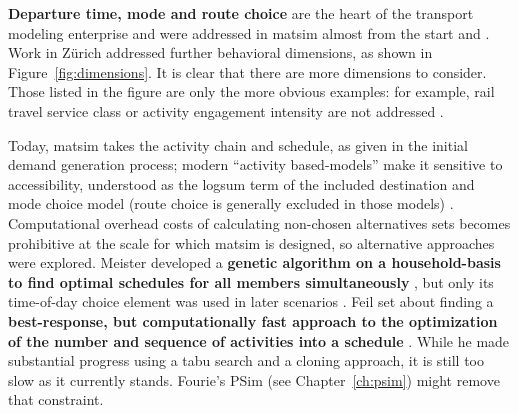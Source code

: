
\textbf{Departure time, mode and route choice} are the heart of the transport modeling enterprise and were addressed in \gls{matsim} almost from the start \citep{RaneyNagel2004agdb} and \citep{BalmerRaneyEtAl2005act-times,RieserGretherNagel2008modeChoiceCalculations}.
%
Work in Zürich addressed further behavioral dimensions, 
as shown in Figure~\ref{fig:dimensions}.
It is clear that there are more dimensions to consider. Those listed in the figure are only the more obvious examples: for example, rail travel service class or activity engagement intensity are not addressed . 

Today, \gls{matsim} takes the activity chain and schedule, as given in the initial demand generation process; modern ``activity based-models'' make it sensitive to accessibility, understood as the logsum term of the included destination and mode choice model (route choice is generally excluded in those models) \citep[see][for an early example]{BenAkivaEtAl_Transportation_1996}.
Computational overhead costs of calculating non-chosen alternatives sets becomes prohibitive at the scale for which \gls{matsim} is designed,
 so alternative approaches were explored. 
%
Meister developed a \textbf{genetic algorithm on a household-basis to find optimal schedules for all members simultaneously} \citep[reported in][]{MeisterEtAl_Transportation_2005},
but only its time-of-day choice element was used in later scenarios \citep{MeisterEtAl_IATBR_2006}.
%
Feil set about finding a \textbf{best-response, but computationally fast approach to the optimization of the number and sequence of activities into a schedule} \citep[][]{Feil_PhDThesis_2010}. While he made substantial progress using a tabu search and a cloning approach, it is still too slow as it currently stands. Fourie's PSim (see Chapter~\ref{ch:psim}) might remove that constraint.

